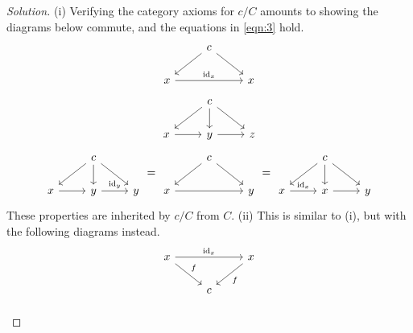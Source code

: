 \documentclass{article}
\newenvironment{solution}{\begin{proof}[Solution]}{\end{proof}}
\begin{document}
\begin{solution}
    (i) Verifying the category axioms for $c/C$ amounts to showing the diagrams below commute, and the equations in \eqref{eqn:3} hold.
    \begin{equation} \label{eqn:1}
        \begin{tikzcd}
            & c \arrow[dl] \arrow[dr]\\
            x \arrow[rr, "\text{id}_x"] && x
        \end{tikzcd}
    \end{equation}
    \begin{equation}\label{eqn:2}
        \begin{tikzcd}
            & c \arrow[dr]\arrow[d]\arrow[dl]\\
            x  \arrow[r] & y \arrow[r]  & z 
        \end{tikzcd}
    \end{equation}
    \begin{equation}\label{eqn:3}
        \begin{tikzcd}
            & c \arrow[dr]\arrow[d]\arrow[dl]\\
            x  \arrow[r] & y \arrow[r, "\text{id}_y"]  & y 
        \end{tikzcd}
        =
        \begin{tikzcd}
            & c \arrow[dr]\arrow[dl]\\
            x \arrow[rr]  && y 
        \end{tikzcd}
        =
        \begin{tikzcd}
            & c \arrow[dr]\arrow[d]\arrow[dl]\\
            x  \arrow[r, "\text{id}_x"] & x \arrow[r]  & y 
        \end{tikzcd}
    \end{equation}
    These properties are inherited by $c/C$ from $C$. 
    (ii) This is similar to (i), but with the following diagrams instead. 
    \begin{equation*}
        \begin{tikzcd}
            x \arrow[dr, "f"] \arrow[rr, "\text{id}_x"] && x \arrow[dl, "f"] \\
            & c
        \end{tikzcd}
    \end{equation*}
    \begin{equation*}
        \begin{tikzcd}

\end{tikzcd}
\end{equation*}
\end{solution}
\end{document}
